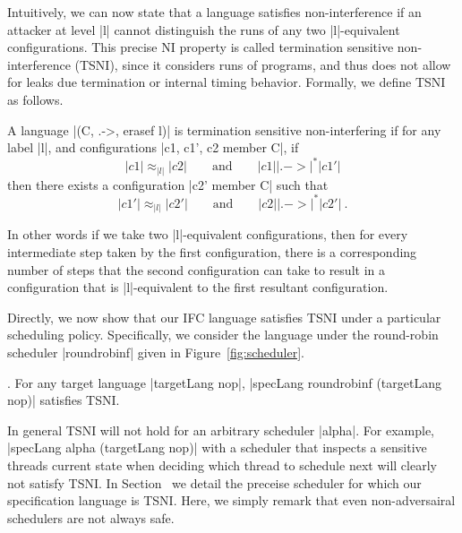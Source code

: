 Intuitively, we can now state that a language satisfies non-interference if an
attacker at level |l| cannot distinguish the runs of any two |l|-equivalent
configurations.
%
This precise NI property is called termination sensitive non-interference
(TSNI), since it considers runs of programs, and thus does not allow for leaks
due termination or internal timing behavior.
%
Formally, we define TSNI as follows.

\begin{definition}
  A language |(C, .->, erasef l)| is termination
  sensitive non-interfering if for any label |l|, and configurations
  |c1, c1', c2 member C|, if
  \begin{equation} \label{eq:tsni-lhs}
    |c1| \approx_{|l|} |c2|
    \qquad \text{and} \qquad
    |c1| |.->|^* |c1'|
  \end{equation}
  then there exists a configuration |c2' member C| such that
  \begin{equation} \label{eq:tsni-rhs}
    |c1'| \approx_{|l|} |c2'|
     \qquad \text{and} \qquad
    |c2| |.->|^* |c2'|
    \ \text{.}
  \end{equation}
\end{definition}
%
In other words if we take two |l|-equivalent configurations, then for every
intermediate step taken by the first configuration, there is a corresponding
number of steps that the second configuration can take to result in a
configuration that is |l|-equivalent to the first resultant configuration.


Directly, we now show that our IFC language satisfies TSNI under a particular
scheduling policy.
%
Specifically, we consider the language under the round-robin scheduler
|roundrobinf| given in Figure~\ref{fig:scheduler}.

\begin{theorem}.
  \label{thm:rr-tsni}
For any target language |targetLang nop|, |specLang roundrobinf
(targetLang nop)| satisfies TSNI.
\end{theorem}

In general TSNI will not hold for an arbitrary scheduler |alpha|.
%
For example, |specLang alpha (targetLang nop)| with a scheduler that inspects a
sensitive threads current state when deciding which thread to schedule next
will clearly not satisfy TSNI.
%
In Section~\toref{} we detail the preceise scheduler for which our
specification language is TSNI.
%
Here, we simply remark that even non-adversairal schedulers are not always safe.

